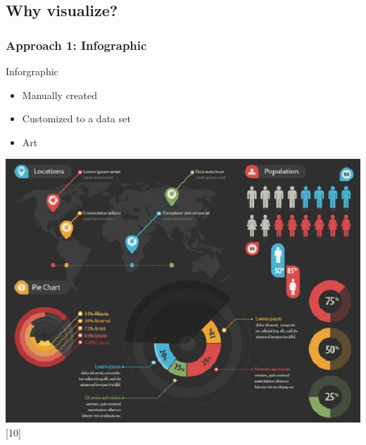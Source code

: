 \subsection{Why visualize?}
\begin{frame}
	\frametitle{Approach 1: Infographic}
	\begin{center}
		\vspace{-10pt}
  		\begin{block}{Inforgraphic} 
			\begin{itemize}
				\item Manually created
				\item Customized to a data set
				\item Art
			\end{itemize}
		\end{block}
	\end{center}	

   \begin{center}
     \includegraphics[scale=0.25]{images/infographic}[10]
    \end{center}

\end{frame}


